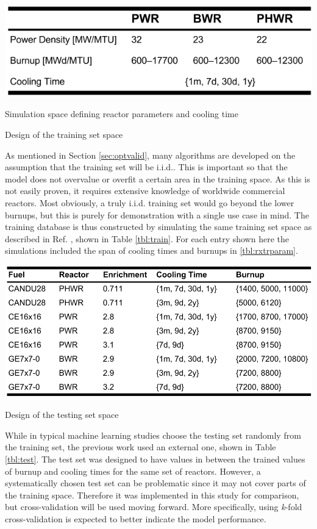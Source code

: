 \begin{table}[!hp]
  \begin{subtable}{\linewidth}
    \centering
    \includegraphics[width=0.7\linewidth]{./chapters/demo_method/TrainData2.png}
    \caption{Simulation space defining reactor parameters and cooling time}
    \label{tbl:rxtrparam}
  \end{subtable}%
  \caption{Design of the training set space}
  \label{tbl:train}
\end{table}

As mentioned in Section \ref{sec:optvalid}, many algorithms are developed on
the assumption that the training set will be \gls{i.i.d.}. This is important so
that the model does not overvalue or overfit a certain area in the training
space. As this is not easily proven, it requires extensive knowledge of
worldwide commercial reactors. Most obviously, a truly \gls{i.i.d.} training
set would go beyond the lower burnups, but this is purely for demonstration
with a single use case in mind.  The training database is thus constructed by
simulating the same training set space as described in Ref.
\cite{dayman_feasibility_2013}, shown in Table \ref{tbl:train}. For each entry
shown here the simulations included the span of cooling times and burnups in
\ref{tbl:rxtrparam}. 

\begin{table}[!hp]
  \centering
  \includegraphics[width=0.95\linewidth]{./chapters/demo_method/TestData.png}
  \caption{Design of the testing set space}
  \label{tbl:test}
\end{table}

While in typical machine learning studies choose the testing set randomly from
the training set, the previous work used an external one, shown in Table
\ref{tbl:test}.  The test set was designed to have values in between the
trained values of burnup and cooling times for the same set of reactors.
However, a systematically chosen test set can be problematic since it may not
cover parts of the training space.  Therefore it was implemented in this study
for comparison, but cross-validation will be used moving forward. More
specifically, using \textit{k}-fold cross-validation is expected to better
indicate the model performance. 

